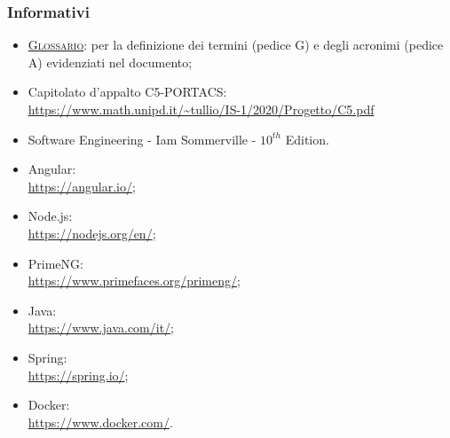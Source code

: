 \subsubsection{Informativi}
\begin{itemize}
	\item \textsc{\href{https://github.com/Three-Way-Milkshake/docs/wiki/Glossario}{Glossario}}: per la definizione dei termini (pedice G) e degli acronimi (pedice A) evidenziati nel documento;
	\item Capitolato d'appalto C5-PORTACS: \\
{\url{https://www.math.unipd.it/~tullio/IS-1/2020/Progetto/C5.pdf}}
	\item Software Engineering - Iam Sommerville - $10^{th}$ Edition.
	\item Angular: \\ {\url{https://angular.io/}};
	\item Node.js: \\ {\url{https://nodejs.org/en/}};
	\item PrimeNG: \\ {\url{https://www.primefaces.org/primeng/}};
	\item Java: \\ {\url{https://www.java.com/it/}};
	\item Spring: \\ {\url{https://spring.io/}};
	\item Docker: \\ {\url{https://www.docker.com/}}.
	
\end{itemize}